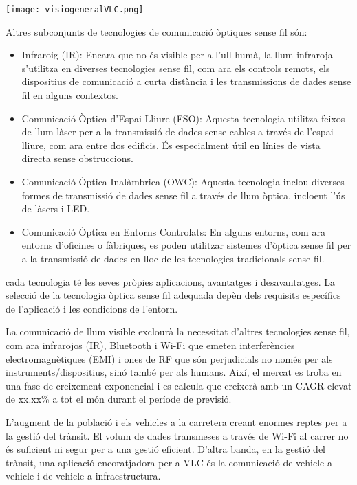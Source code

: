 \begin{center}
    \texttt{[image: visiogeneralVLC.png]}\\\vfill
\end{center}



Altres subconjunts de tecnologies de comunicació òptiques sense fil són:
\begin{itemize}
    \item Infraroig (IR): Encara que no és visible per a l'ull humà, la llum infraroja s'utilitza en diverses tecnologies sense fil, com ara els controls remots, els dispositius de comunicació a curta distància i les transmissions de dades sense fil en alguns contextos.
    \item Comunicació Òptica d'Espai Lliure (FSO): Aquesta tecnologia utilitza feixos de llum làser per a la transmissió de dades sense cables a través de l'espai lliure, com ara entre dos edificis. És especialment útil en línies de vista directa sense obstruccions.
    \item Comunicació Òptica Inalàmbrica (OWC): Aquesta tecnologia inclou diverses formes de transmissió de dades sense fil a través de llum òptica, incloent l'ús de làsers i LED.
    \item Comunicació Òptica en Entorns Controlats: En alguns entorns, com ara entorns d'oficines o fàbriques, es poden utilitzar sistemes d'òptica sense fil per a la transmissió de dades en lloc de les tecnologies tradicionals sense fil.
\end{itemize}

cada tecnologia té les seves pròpies aplicacions, avantatges i desavantatges. La selecció de la tecnologia òptica sense fil adequada depèn dels requisits específics de l'aplicació i les condicions de l'entorn.


La comunicació de llum visible exclourà la necessitat d'altres tecnologies sense fil, com ara infrarojos (IR), Bluetooth i Wi-Fi que emeten interferències electromagnètiques (EMI) i ones de RF que són perjudicials no només per als instruments/dispositius, sinó també per als humans. Així, el mercat es troba en una fase de creixement exponencial i es calcula que creixerà amb un CAGR elevat de xx.xx\% a tot el món durant el període de previsió.


L'augment de la població i els vehicles a la carretera creant enormes reptes per a la gestió del trànsit. El volum de dades transmeses a través de Wi-Fi al carrer no és suficient ni segur per a una gestió eficient. D'altra banda, en la gestió del trànsit, una aplicació encoratjadora per a VLC és la comunicació de vehicle a vehicle i de vehicle a infraestructura.

